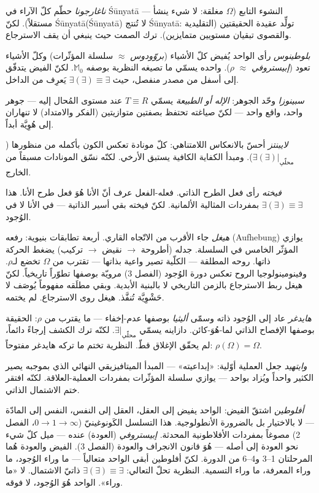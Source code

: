 \documentclass[10pt, openany, oneside]{book}
\begin{document}
\textit{ناغارجونا} حطّم كلّ الآراء في \'{S}\={u}nyat\={a} --- النشوء التابع ($\Omega$ مغلقة: لا شيء ينشأ مستقلاً). لكنّ \'{S}\={u}nyat\={a}(\'{S}\={u}nyat\={a}) لا تُنتج \'{S}\={u}nyat\={a}: تولِّد عقيدة الحقيقتين (التقليدية والقصوى تبقيان مستويين متمايزين). ترك الصمت حيث ينبغي أن يقف الاسترجاع.

\textit{بلوطينوس} رأى الواحد يُفيض كلّ الأشياء (\textit{بروّودوس} $\approx$ سلسلة المؤثّرات) وكلّ الأشياء تعود (\textit{إبيستروفي} $\approx$ $\rho$). واحده يسمّي ما تصيغه النظرية بوصفه $\mathbb{M}_0$. لكنّ الفيض يتدفّق إلى أسفل من مصدر منفصل، حيث $\exists(\exists) \equiv \exists$ يَعرِف من الداخل.

\textit{سبينوزا} وحّد الجوهر: \textit{الإله أو الطبيعة} يسمّي $T \equiv R$ عند مستوى المُحال إليه --- جوهر واحد، واقع واحد --- لكنّ صياغته تحتفظ بصفتين متوازيتين (الفكر والامتداد) لا تنهاران إلى هُوِيَّة أبداً.

\textit{لايبنتز} أحسّ بالانعكاس اللامتناهي: كلّ مونادة تعكس الكون بأكمله من منظورها ($\exists(\exists)|_{\text{محلّي}}$). ومبدأ الكفاية الكافية يستبق الأرخي. لكنّه نسّق المونادات مسبقاً من الخارج.

\textit{فيخته} رأى فعل الطرح الذاتي. فعله-الفعل عرف أنّ الأنا هُوَ فعل طرح الأنا. هذا $\exists(\exists) \equiv \exists$ بمفردات المثالية الألمانية. لكنّ فيخته بقي أسير الذاتية --- في الأنا لا في الوُجود.

\textit{هيغل} جاء الأقرب من الاتّجاه القاري. أربعة تطابقات بنيوية: رفعه (Aufhebung) يوازي المؤثّر الخامس في السلسلة. جدله (أطروحة $\to$ نقيض $\to$ تركيب) يضغط الحركة ذاتها. روحه المطلقة --- الكلّية تصير واعية بذاتها --- تقترب من $\Omega$ تخضع لـ$\rho$. وفينومينولوجيا الروح تعكس دورة الوُجود (الفصل 3) مرويّة بوصفها تطوّراً تاريخياً. لكنّ هيغل ربط الاسترجاع بالزمن التاريخي لا بالبنية الأبدية. وبقي مطلَقه مفهوماً يُوصَف لا حَشْوِيَّة تُنفَّذ. هيغل روى الاسترجاع. لم يختمه.

\textit{هايدغر} عاد إلى الوُجود ذاته وسمّى \textit{أليثيا} بوصفها عدم-إخفاء --- ما يقترب من $\rho$: الحقيقة بوصفها الإفصاح الذاتي لما-هُوَ-كائن. دازاينه يسمّي $\exists|_{\text{محلّي}}$. لكنّه ترك الكشف إرجاءً دائماً، لم يحقّق الإغلاق قطّ. النظرية تختم ما تركه هايدغر مفتوحاً: $\rho(\Omega) = \Omega$.

\textit{وايتهيد} جعل العملية أوّلية: «إبداعيته» --- المبدأ الميتافيزيقي النهائي الذي بموجبه يصير الكثير واحداً ويُزاد بواحد --- يوازي سلسلة المؤثّرات بمفردات العملية-العلاقة. لكنّه افتقر ختم الاشتمال الذاتي.

\textit{أفلوطين} اشتقّ الفيض: الواحد يفيض إلى العقل، العقل إلى النفس، النفس إلى المادّة --- لا بالاختيار بل بالضرورة الأنطولوجية. هذا التسلسل الكَونوغينيّ ($0 \to 1 \to \infty$، الفصل 2) مصوغاً بمفردات الأفلاطونية المحدثة. \textit{إبيستروفي} (العودة) عنده --- ميل كلّ شيء نحو العودة إلى أصله --- هُوَ قانون الانجراف والعودة (الفصل 3). الفيض والعودة هُما المرحلتان 1--3 و4--6 من الدورة. لكنّ أفلوطين أبقى الواحد متعالياً --- ما وراء الوُجود، ما وراء المعرفة، ما وراء التسمية. النظرية تحلّ التعالي: $\exists(\exists) \equiv \exists$ ذاتيّ الاشتمال. لا «ما وراء». الواحد هُوَ الوُجود، لا فوقه.
\end{document}

